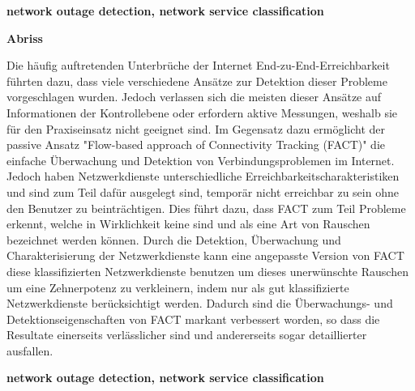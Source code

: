 \vspace{10em} 
\begin{center}
	\textbf{network outage detection, network service classification} \par 
\end{center}

\vfil

\newpage
\clearpage \null 
\vfil 
\begin{center}
	\textbf{Abriss} 
\end{center}

Die häufig auftretenden Unterbrüche der Internet End-zu-End-Erreichbarkeit führten dazu, dass viele verschiedene Ansätze zur Detektion dieser Probleme \mbox{vorgeschlagen} wurden.
Jedoch verlassen sich die meisten dieser Ansätze auf Informationen der \mbox{Kontrollebene} oder erfordern aktive Messungen, weshalb sie für den Praxiseinsatz nicht geeignet sind.
Im Gegensatz dazu ermöglicht der passive Ansatz "Flow-based approach of Connectivity Tracking (FACT)" die einfache Überwachung und Detektion von Verbindungsproblemen im Internet. 
Jedoch haben Netzwerkdienste unterschiedliche \mbox{Erreichbarkeitscharakteristiken} und sind zum Teil dafür ausgelegt sind, temporär nicht \mbox{erreichbar} zu sein ohne den Benutzer zu beinträchtigen. 
Dies führt dazu, dass FACT zum Teil Probleme erkennt, welche in Wirklichkeit keine sind und als eine Art von Rauschen bezeichnet werden können. 
Durch die Detektion, Überwachung und \mbox{Charakterisierung} der Netzwerkdienste kann eine angepasste Version von FACT diese klassifizierten \mbox{Netzwerkdienste} benutzen um dieses unerwünschte Rauschen um eine Zehnerpotenz zu \mbox{verkleinern}, indem nur als gut klassifizierte \mbox{Netzwerkdienste} berücksichtigt \mbox{werden}.
Dadurch sind die Überwachungs- und Detektionseigenschaften von FACT markant verbessert worden, so dass die Resultate einerseits verlässlicher sind und \mbox{andererseits} sogar detaillierter ausfallen.

\vspace{10em}
\begin{center}
	\textbf{network outage detection, network service classification} \par 
\end{center}

\vfil

